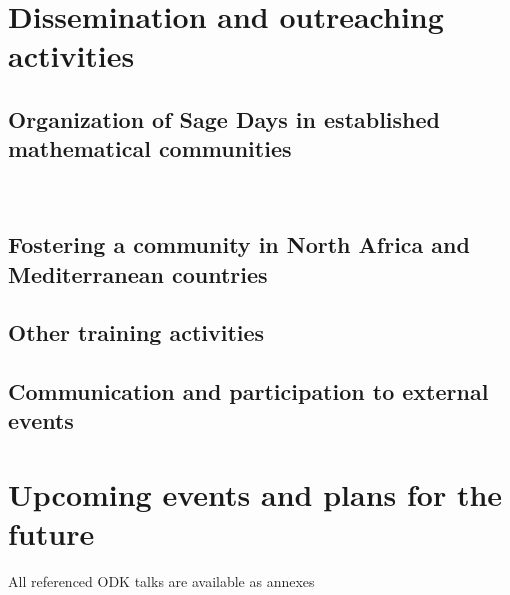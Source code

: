 \documentclass{../../Proposal/LaTeX-proposal/deliverablereport}
\begin{document}









%







\section{Dissemination and outreaching activities}

\subsection{Organization of Sage Days in established mathematical communities}
~





\subsection{Fostering a community in North Africa and Mediterranean countries}

\subsection{Other training activities}

\subsection{Communication and participation to external events}

















\section{Upcoming events and plans for the future}




\footnotesize{All referenced ODK talks are available as annexes}
\end{document}
